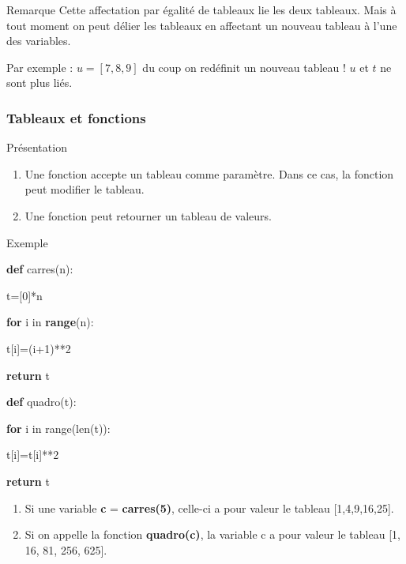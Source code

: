 \documentclass[9pt]{beamer}
\newcounter{num}
\begin{document}
\begin{frame}
\begin{alertblock}{Remarque}
Cette affectation par égalité de tableaux lie les deux tableaux. Mais à tout moment on peut délier les tableaux en affectant un nouveau tableau à l'une des variables.

Par exemple : $u=[7,8,9]$ du coup on redéfinit un nouveau tableau ! $u$ et $t$ ne sont plus liés.
\end{alertblock}

\end{frame}


\begin{frame}
\frametitle{Tableaux et fonctions}

\begin{block}{Présentation}
\begin{enumerate}
\item Une fonction accepte un tableau comme paramètre. Dans ce cas, la fonction peut modifier le tableau.
\item Une fonction peut retourner un tableau de valeurs.
\end{enumerate}

\end{block}

\begin{exampleblock}{Exemple}
\begin{minipage}{0.45\textwidth}
\textbf{def} carres(n):

\hspace{0.5cm}t=[0]*n

\hspace{0.5cm}\textbf{for} i in \textbf{range}(n):

\hspace{1cm}t[i]=(i+1)**2

\hspace{0.5cm}\textbf{return} t
\end{minipage}\hfill
\begin{minipage}{0.45\textwidth}
\textbf{def} quadro(t):

\hspace{0.5cm}\textbf{for} i in range(len(t)):

\hspace{1cm}t[i]=t[i]**2

\hspace{0.5cm}\textbf{return} t\\
\end{minipage}
\medskip

\begin{enumerate}
\item Si une variable \textbf{c} = \textbf{carres(5)}, celle-ci a pour valeur le tableau [1,4,9,16,25].
\item Si on appelle la fonction \textbf{quadro(c)}, la variable c a pour valeur le tableau [1, 16, 81, 256, 625].
\end{enumerate}
\end{exampleblock}


\end{frame}
\end{document}
